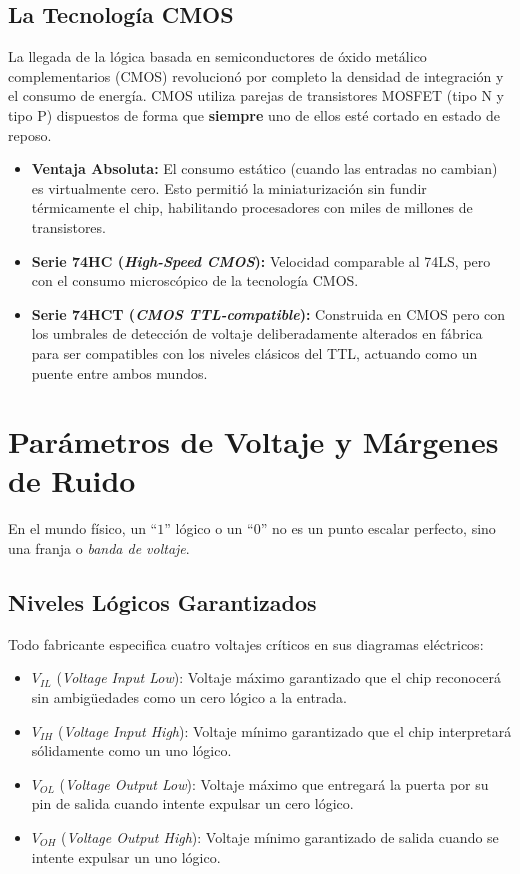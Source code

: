 \subsection{La Tecnología CMOS}
La llegada de la lógica basada en semiconductores de óxido metálico complementarios (CMOS) revolucionó por completo la densidad de integración y el consumo de energía. CMOS utiliza parejas de transistores MOSFET (tipo N y tipo P) dispuestos de forma que \textbf{siempre} uno de ellos esté cortado en estado de reposo.

\begin{itemize}
    \item \textbf{Ventaja Absoluta:} El consumo estático (cuando las entradas no cambian) es virtualmente cero. Esto permitió la miniaturización sin fundir térmicamente el chip, habilitando procesadores con miles de millones de transistores.
    \item \textbf{Serie 74HC (\textit{High-Speed CMOS}):} Velocidad comparable al 74LS, pero con el consumo microscópico de la tecnología CMOS.
    \item \textbf{Serie 74HCT (\textit{CMOS TTL-compatible}):} Construida en CMOS pero con los umbrales de detección de voltaje deliberadamente alterados en fábrica para ser compatibles con los niveles clásicos del TTL, actuando como un puente entre ambos mundos.
\end{itemize}

\section{Parámetros de Voltaje y Márgenes de Ruido}

En el mundo físico, un ``$1$'' lógico o un ``$0$'' no es un punto escalar perfecto, sino una franja o \textit{banda de voltaje}.

\subsection{Niveles Lógicos Garantizados}
Todo fabricante especifica cuatro voltajes críticos en sus diagramas eléctricos:
\begin{itemize}
    \item $V_{IL}$ (\textit{Voltage Input Low}): Voltaje máximo garantizado que el chip reconocerá sin ambigüedades como un cero lógico a la entrada.
    \item $V_{IH}$ (\textit{Voltage Input High}): Voltaje mínimo garantizado que el chip interpretará sólidamente como un uno lógico.
    \item $V_{OL}$ (\textit{Voltage Output Low}): Voltaje máximo que entregará la puerta por su pin de salida cuando intente expulsar un cero lógico.
    \item $V_{OH}$ (\textit{Voltage Output High}): Voltaje mínimo garantizado de salida cuando se intente expulsar un uno lógico.
\end{itemize}

